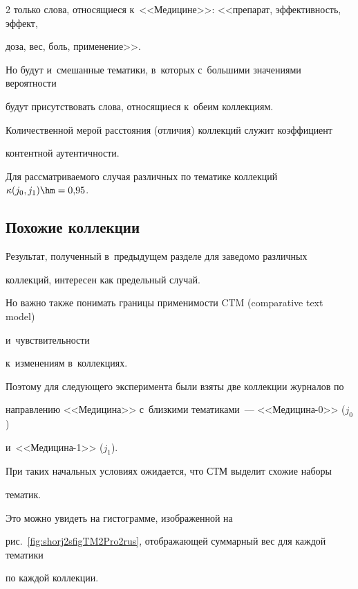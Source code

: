 \begin{multicols}{2}
только слова, относящиеся к~<<Медицине>>: <<препарат, эффективность, эффект, 


доза, вес, боль, применение>>.


    Но будут и~смешанные тематики, в~которых с~большими значениями вероятности 


будут присутствовать слова, относящиеся к~обеим коллекциям.


    Количественной мерой расстояния (отличия) коллекций служит коэффициент 


контентной аутентичности.


    Для рассматриваемого случая различных по тематике коллекций $\kappa 


(j_0,j_1) \hm= 0{,}95$.








    


    \subsection{Похожие коллекции}


    


    Результат, полученный в~предыдущем разделе для заведомо различных 


коллекций, интересен как предельный случай.


    Но важно также понимать границы применимости CTM (comparative text model)


    и~чувствительности 


    к~изменениям в~коллекциях.


    Поэтому для следующего эксперимента были взяты две коллекции журналов по 


направлению <<Медицина>> с~близкими тематиками~--- <<Медицина-0>> ($j_0$) 


и~<<Медицина-1>> ($j_1$).


    При таких начальных условиях ожидается, что СТМ выделит схожие наборы 


тематик.


       Это можно увидеть на гистограмме, изоб\-ра\-жен\-ной на 


       рис.~\ref{fig:shorj2sfigTM2Pro2rus}, отображающей суммарный вес для каждой тематики 


по каждой коллекции.


    






\end{multicols}
